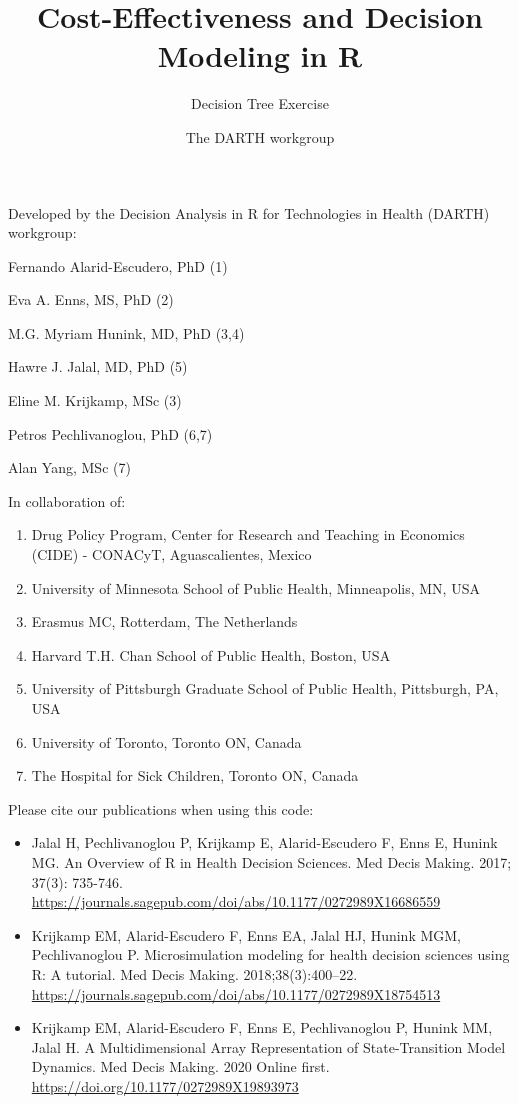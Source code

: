 \documentclass[
]{article}
\title{Cost-Effectiveness and Decision Modeling in R}
\subtitle{Decision Tree Exercise}
\author{The DARTH workgroup}
\date{}
\providecommand{\tightlist}{%
  \setlength{\itemsep}{0pt}\setlength{\parskip}{0pt}}
\begin{document}
\maketitle

Developed by the Decision Analysis in R for Technologies in Health
(DARTH) workgroup:

Fernando Alarid-Escudero, PhD (1)

Eva A. Enns, MS, PhD (2)

M.G. Myriam Hunink, MD, PhD (3,4)

Hawre J. Jalal, MD, PhD (5)

Eline M. Krijkamp, MSc (3)

Petros Pechlivanoglou, PhD (6,7)

Alan Yang, MSc (7)

In collaboration of:

\begin{enumerate}
\def\labelenumi{\arabic{enumi}.}
\tightlist
\item
  Drug Policy Program, Center for Research and Teaching in Economics
  (CIDE) - CONACyT, Aguascalientes, Mexico
\item
  University of Minnesota School of Public Health, Minneapolis, MN, USA
\item
  Erasmus MC, Rotterdam, The Netherlands
\item
  Harvard T.H. Chan School of Public Health, Boston, USA
\item
  University of Pittsburgh Graduate School of Public Health, Pittsburgh,
  PA, USA
\item
  University of Toronto, Toronto ON, Canada
\item
  The Hospital for Sick Children, Toronto ON, Canada
\end{enumerate}

Please cite our publications when using this code:

\begin{itemize}
\item
  Jalal H, Pechlivanoglou P, Krijkamp E, Alarid-Escudero F, Enns E,
  Hunink MG. An Overview of R in Health Decision Sciences. Med Decis
  Making. 2017; 37(3): 735-746.
  \url{https://journals.sagepub.com/doi/abs/10.1177/0272989X16686559}
\item
  Krijkamp EM, Alarid-Escudero F, Enns EA, Jalal HJ, Hunink MGM,
  Pechlivanoglou P. Microsimulation modeling for health decision
  sciences using R: A tutorial. Med Decis Making. 2018;38(3):400--22.
  \url{https://journals.sagepub.com/doi/abs/10.1177/0272989X18754513}
\item
  Krijkamp EM, Alarid-Escudero F, Enns E, Pechlivanoglou P, Hunink MM,
  Jalal H. A Multidimensional Array Representation of State-Transition
  Model Dynamics. Med Decis Making. 2020 Online first.
  \url{https://doi.org/10.1177/0272989X19893973}
\end{itemize}
\end{document}

